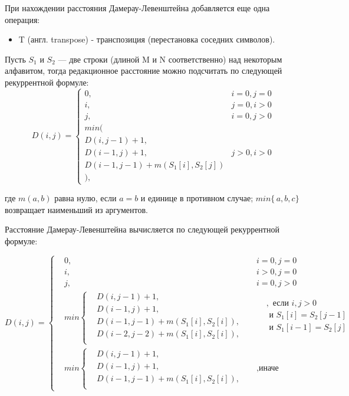 \documentclass[14pt]{report}
\begin{document}
При нахождении расстояния Дамерау-Левенштейна добавляется еще одна операция:
\begin{itemize}
	\item T (англ. transpose) - транспозиция (перестановка соседних символов).
\end{itemize}

Пусть $S_{1}$ и $S_{2}$ — две строки (длиной M и N соответственно) над некоторым алфавитом, тогда редакционное расстояние можно подсчитать по следующей рекуррентной формуле:
\begin{displaymath}
D(i,j) = \left\{ \begin{array}{ll}
 0, & \textrm{$i = 0, j = 0$}\\
 i, & \textrm{$j = 0, i > 0$}\\
 j, & \textrm{$i = 0, j > 0$}\\
min(\\
D(i,j-1)+1,\\
D(i-1, j) +1, &\textrm{$j>0, i>0$}\\
D(i-1, j-1) + m(S_{1}[i], S_{2}[j])\\
),
  \end{array} \right.
\end{displaymath}

где $m(a,b)$ равна нулю, если $a=b$ и единице в противном случае; $min\{\,a,b,c\}$ возвращает наименьший из аргументов.

Расстояние Дамерау-Левенштейна вычисляется по следующей рекуррентной формуле:

\[ D(i, j) =  \left\{
\begin{aligned}
&0, && i = 0, j = 0\\
 &i, && i > 0, j = 0\\
 &j, && i = 0, j > 0\\
 &min \left\{
\begin{aligned}
 &D(i, j - 1) + 1,\\
			 &D(i - 1, j) + 1,\\
			 &D(i - 1, j - 1) + m(S_{1}[i], S_{2}[i]), \\
			 &D(i - 2, j - 2) + m(S_{1}[i], S_{2}[i]),\\
	 \end{aligned} \right.
	 &&
\begin{aligned}
 &, \text{ если } i, j > 0 \\
			 & \text{ и } S_{1}[i] = S_{2}[j - 1] \\
			 & \text{ и } S_{1}[i - 1] =  S_{2}[j] \\
	 \end{aligned} \\
	 &min \left\{
	 \begin{aligned}
			 &D(i, j - 1) + 1,\\
			 &D(i - 1, j) + 1, \\
			 &D(i - 1, j - 1) + m(S_{1}[i], S_{2}[i]),\\
	 \end{aligned} \right.  &&, \text{иначе}
\end{aligned} \right.
\]
\end{document}

